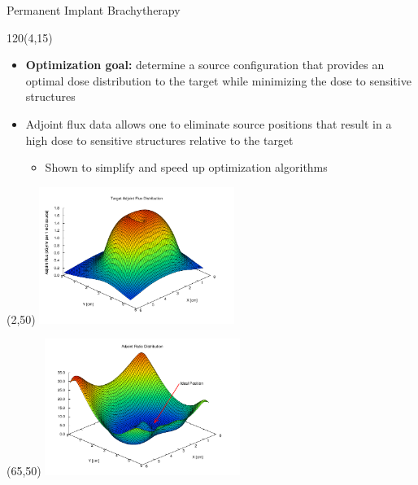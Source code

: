 \documentclass{beamer}
\begin{document}
\begin{frame}{Permanent Implant Brachytherapy}

  \begin{textblock}{120}(4,15)
    \begin{itemize}
      \item \textbf{Optimization goal:} determine a source configuration
        that provides an optimal dose distribution to the target while
        minimizing the dose to sensitive structures
        \medskip
      \item Adjoint flux data allows one to eliminate source positions that 
        result in a high dose to sensitive structures relative to the target
        \smallskip
        \begin{itemize}
          \item Shown to simplify and speed up optimization algorithms
        \end{itemize}
    \end{itemize}
  \end{textblock}

   \begin{textblock}{20}(2,50)
    \includegraphics[width=2.5in]{figures/Target_adjoint_flux-midplane.pdf}
  \end{textblock}

   \begin{textblock}{20}(65,50)
    \includegraphics[width=2.5in]{figures/adjoint_ratio-slice5.pdf}
  \end{textblock}

\end{frame}
\end{document}
